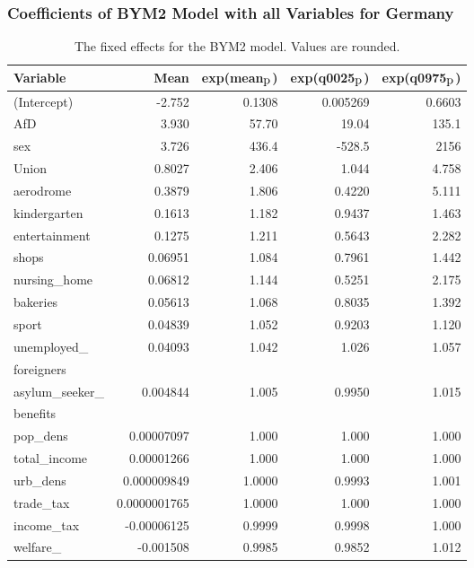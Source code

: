 \subsubsection{Coefficients of BYM2 Model with all Variables for Germany}
\begin{table}[H] 
\caption{The fixed effects for the BYM2 model. Values are rounded. \label{allGermanyBYM2}}
\begin{tabular}{l r r r r}
\toprule
\textbf{Variable}	& \textbf{Mean}	& \textbf{exp(mean$_{\hbox{p}}$)} & \textbf{exp(q0025$_{\hbox{p}}$)} & \textbf{exp(q0975$_{\hbox{p}}$)} \\
\midrule
(Intercept) & -2.752 & 0.1308 & 0.005269 & 0.6603\\
AfD & 3.930 & 57.70  & 19.04 & 135.1 \\
sex & 3.726 & 436.4 & -528.5 & 2156 \\
Union & 0.8027 & 2.406 & 1.044 & 4.758 \\
aerodrome & 0.3879 & 1.806 & 0.4220 & 5.111 \\
kindergarten & 0.1613 & 1.182 & 0.9437 & 1.463 \\
entertainment & 0.1275 & 1.211 & 0.5643 & 2.282 \\
shops & 0.06951 & 1.084 & 0.7961 & 1.442 \\
nursing\_home & 0.06812 & 1.144 & 0.5251 & 2.175 \\
bakeries & 0.05613 & 1.068 & 0.8035 & 1.392 \\
sport & 0.04839 & 1.052 &  0.9203 & 1.120 \\
unemployed\_ & \multirow{2}{*}{0.04093} & \multirow{2}{*}{1.042}  & \multirow{2}{*}{1.026} & \multirow{2}{*}{1.057}\\
foreigners  \\
asylum\_seeker\_ & \multirow{2}{*}{0.004844} & \multirow{2}{*}{1.005}  & \multirow{2}{*}{0.9950} & \multirow{2}{*}{1.015}\\
benefits  \\
pop\_dens & 0.00007097 & 1.000 & 1.000 & 1.000 \\
total\_income & 0.00001266 & 1.000 & 1.000 & 1.000 \\
urb\_dens & 0.000009849  & 1.0000 & 0.9993 & 1.001 \\
trade\_tax &  0.0000001765 & 1.0000 & 1.000 & 1.000\\
income\_tax &  -0.00006125 & 0.9999 &  0.9998 & 1.000 \\
welfare\_ & \multirow{2}{*}{-0.001508} & \multirow{2}{*}{0.9985}  & \multirow{2}{*}{0.9852} & \multirow{2}{*}{1.012}\\

\end{tabular}
\end{table}
